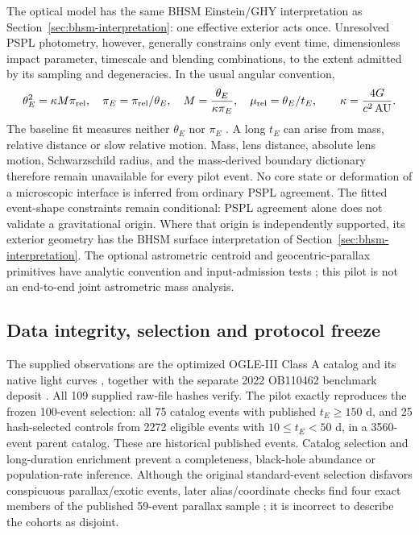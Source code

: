 The optical model has the same BHSM Einstein/GHY interpretation as
Section~\ref{sec:bhsm-interpretation}: one effective exterior acts once.
Unresolved PSPL photometry, however, generally constrains only event
time, dimensionless impact parameter, timescale and blending combinations,
to the extent admitted by its sampling and degeneracies. In the usual
angular convention,
\begin{equation}
 \theta_E^2=\kappa M\pi_{\rm rel},\quad
 \pi_E=\pi_{\rm rel}/\theta_E,\quad
 M=\frac{\theta_E}{\kappa\pi_E},\quad
 \mu_{\rm rel}=\theta_E/t_E,\qquad
 \kappa=\frac{4G}{c^2\,\mathrm{AU}}.
 \label{eq:native-mass-identifiability}
\end{equation}
The baseline fit measures neither $\theta_E$ nor $\pi_E$
\cite{Gould2014}. A long $t_E$ can arise from mass, relative distance or
slow relative motion. Mass, lens distance, absolute lens motion,
Schwarzschild radius, and the mass-derived boundary dictionary therefore
remain unavailable for every pilot event. No core state or deformation
of a microscopic interface is inferred from ordinary PSPL agreement.
The fitted event-shape constraints remain conditional: PSPL agreement
alone does not validate a gravitational origin. Where that origin is
independently supported, its exterior geometry has the BHSM surface
interpretation of Section~\ref{sec:bhsm-interpretation}. The optional astrometric
centroid and geocentric-parallax primitives have analytic convention and
input-admission tests \cite{DominikSahu2000,Gould2004}; this pilot is not
an end-to-end joint astrometric mass analysis.

\subsection{Data integrity, selection and protocol freeze}

The supplied observations are the optimized OGLE-III Class A catalog and
its native light curves \cite{Wyrzykowski2015}, together with the
separate 2022 OB110462 benchmark deposit \cite{Lam2022Data}. All 109
supplied raw-file hashes verify. The pilot exactly reproduces the frozen
100-event selection: all 75 catalog events with published $t_E\geq150$
d, and 25 hash-selected controls from 2272 eligible events with
$10\leq t_E<50$ d, in a 3560-event parent catalog. These are historical
published events. Catalog selection and long-duration enrichment prevent
a completeness, black-hole abundance or population-rate inference.
Although the original standard-event selection disfavors conspicuous
parallax/exotic events, later alias/coordinate checks find four exact
members of the published 59-event parallax sample
\cite{Wyrzykowski2016}; it is incorrect to describe the cohorts as disjoint.

